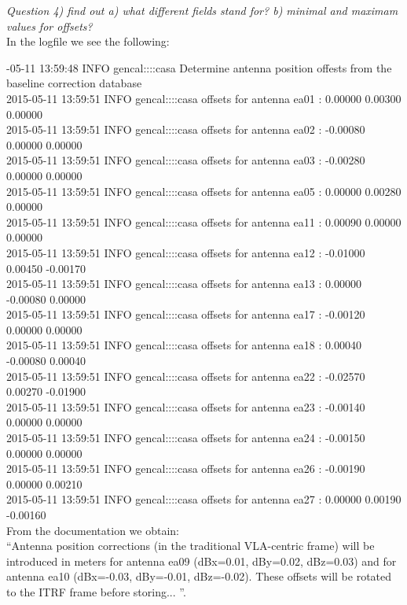 \documentclass[12pt, a4paper]{article}
\begin{document}
\noindent \textit{Question 4) find out a) what different fields stand for? b) minimal and maximam values for offsets?} \\
In the logfile we see the following: 

{\tiny {}-05-11 13:59:48	INFO	gencal::::casa	 Determine antenna position offests from the baseline correction database \\
2015-05-11 13:59:51	INFO	gencal::::casa	offsets for antenna ea01 :  0.00000   0.00300   0.00000 \\
2015-05-11 13:59:51	INFO	gencal::::casa	offsets for antenna ea02 : -0.00080   0.00000   0.00000 \\
2015-05-11 13:59:51	INFO	gencal::::casa	offsets for antenna ea03 : -0.00280   0.00000   0.00000 \\
2015-05-11 13:59:51	INFO	gencal::::casa	offsets for antenna ea05 :  0.00000   0.00280   0.00000 \\
2015-05-11 13:59:51	INFO	gencal::::casa	offsets for antenna ea11 :  0.00090   0.00000   0.00000 \\
2015-05-11 13:59:51	INFO	gencal::::casa	offsets for antenna ea12 : -0.01000   0.00450  -0.00170 \\
2015-05-11 13:59:51	INFO	gencal::::casa	offsets for antenna ea13 :  0.00000  -0.00080   0.00000 \\
2015-05-11 13:59:51	INFO	gencal::::casa	offsets for antenna ea17 : -0.00120   0.00000   0.00000 \\
2015-05-11 13:59:51	INFO	gencal::::casa	offsets for antenna ea18 :  0.00040  -0.00080   0.00040 \\
2015-05-11 13:59:51	INFO	gencal::::casa	offsets for antenna ea22 : -0.02570   0.00270  -0.01900 \\
2015-05-11 13:59:51	INFO	gencal::::casa	offsets for antenna ea23 : -0.00140   0.00000   0.00000 \\
2015-05-11 13:59:51	INFO	gencal::::casa	offsets for antenna ea24 : -0.00150   0.00000   0.00000 \\
2015-05-11 13:59:51	INFO	gencal::::casa	offsets for antenna ea26 : -0.00190   0.00000   0.00210 \\
2015-05-11 13:59:51	INFO	gencal::::casa	offsets for antenna ea27 :  0.00000   0.00190  -0.00160 } \\

From the documentation we obtain: \\
``Antenna position corrections (in the traditional VLA-centric frame) will be introduced in meters for antenna ea09 (dBx=0.01, dBy=0.02, dBz=0.03) and for antenna ea10 (dBx=-0.03, dBy=-0.01, dBz=-0.02). These offsets will be rotated to the ITRF frame before storing... ''. \\
\end{document}
